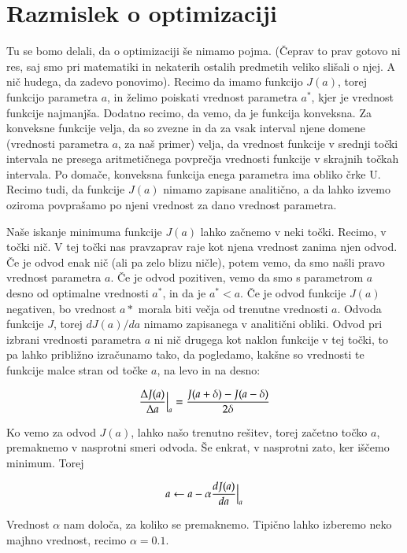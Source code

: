 \section{Razmislek o optimizaciji}

Tu se bomo delali, da o optimizaciji še nimamo pojma. (Čeprav to prav
gotovo ni res, saj smo pri matematiki in nekaterih ostalih predmetih
veliko slišali o njej. A nič hudega, da zadevo ponovimo). Recimo da
imamo funkcijo $J(a)$, torej funkcijo parametra $a$, in želimo poiskati
vrednost parametra $a^*$, kjer je vrednost funkcije najmanjša. Dodatno
recimo, da vemo, da je funkcija konveksna. Za konveksne funkcije
velja, da so zvezne in da za vsak interval njene domene (vrednosti
parametra $a$, za naš primer) velja, da vrednost funkcije v srednji
točki intervala ne presega aritmetičnega povprečja vrednosti funkcije
v skrajnih točkah intervala. Po domače, konveksna funkcija enega
parametra ima obliko črke U. Recimo tudi, da funkcije $J(a)$ nimamo
zapisane analitično, a da lahko izvemo oziroma povprašamo po njeni
vrednost za dano vrednost parametra.

Naše iskanje minimuma funkcije $J(a)$ lahko začnemo v neki
točki. Recimo, v točki nič. V tej točki nas pravzaprav raje kot njena
vrednost zanima njen odvod. Če je odvod enak nič (ali pa zelo blizu
ničle), potem vemo, da smo našli pravo vrednost parametra $a$. Če je
odvod pozitiven, vemo da smo s parametrom $a$ desno od optimalne
vrednosti $a^*$, in da je $a^*<a$. Če je odvod funkcije $J(a)$
negativen, bo vrednost $a*$ morala biti večja od trenutne vrednosti
$a$. Odvoda funkcije $J$, torej $dJ(a)/da$ nimamo zapisanega v
analitični obliki. Odvod pri izbrani vrednosti parametra $a$ ni nič
drugega kot naklon funkcije v tej točki, to pa lahko približno
izračunamo tako, da pogledamo, kakšne so vrednosti te funkcije malce
stran od točke $a$, na levo in na desno:

\begin{equation}
  {\Delta J(a)\over \Delta a}\Bigr|_{a} = {J(a+\delta) - J(a-\delta) \over
    2\delta}
\end{equation}

Ko vemo za odvod $J(a)$, lahko našo trenutno rešitev, torej začetno
točko $a$, premaknemo v nasprotni smeri odvoda. Še enkrat, v nasprotni
zato, ker iščemo minimum. Torej

\begin{equation}
  a \leftarrow a - \alpha {dJ(a)\over da}\Bigr|_{a}
\end{equation}

Vrednost $\alpha$ nam določa, za koliko se premaknemo. Tipično lahko
izberemo neko majhno vrednost, recimo $\alpha=0.1$.

